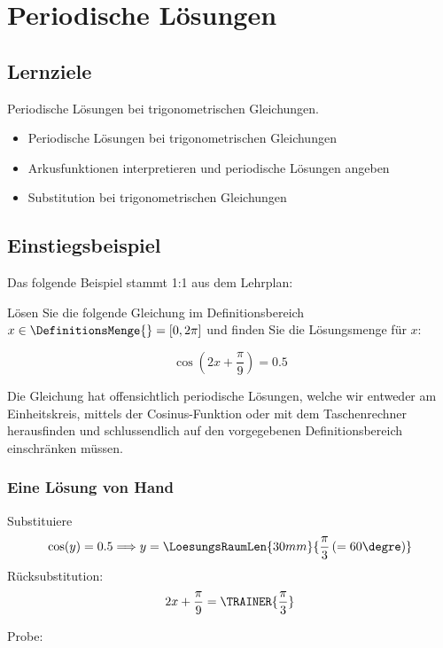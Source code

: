 
\section{Periodische Lösungen}

\subsection*{Lernziele}

Periodische Lösungen bei trigonometrischen Gleichungen.

\begin{itemize}
\item Periodische Lösungen bei trigonometrischen Gleichungen
\item Arkusfunktionen interpretieren und periodische Lösungen angeben
\item Substitution bei trigonometrischen Gleichungen
\end{itemize}
\newpage


\subsection{Einstiegsbeispiel}
Das folgende Beispiel stammt 1:1 aus dem Lehrplan:

Lösen Sie die folgende Gleichung im Definitionsbereich $x \in \DefinitionsMenge{} = [ 0, 2\pi]$ und finden Sie die Lösungsmenge für $x$:

$$\cos\left(2x+\frac{\pi}{9}\right) = 0.5$$

Die Gleichung hat offensichtlich periodische Lösungen, welche wir
entweder am Einheitskreis, mittels der Cosinus-Funktion oder mit dem
Taschenrechner herausfinden und schlussendlich auf den vorgegebenen
Definitionsbereich einschränken müssen.

\subsubsection{Eine Lösung von Hand}

Substituiere 
$$\cos(y) = 0.5 \Longrightarrow y=\LoesungsRaumLen{30mm}{\frac{\pi}3 \left(=60\degre\right)}$$
Rücksubstitution:
$$ 2x+\frac{\pi}9 = \TRAINER{\frac{\pi}3}$$

Probe:

